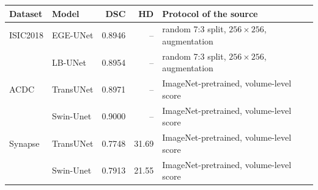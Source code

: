 \begin{tabular}{@{}llrrl@{}}
\toprule
Dataset & Model & DSC & HD\tnote{a} & Protocol of the source \\
\midrule
ISIC2018 & EGE-UNet \citep{Ruan2023EGEUNet} & 0.8946 & -- & random 7:3 split, $256\times256$, augmentation \\
 & LB-UNet \citep{Xu2024LBUNet} & 0.8954 & -- & random 7:3 split, $256\times256$, augmentation \\
ACDC & TransUNet \citep{Chen2021TransUNetArxiv} & 0.8971 & -- & ImageNet-pretrained, volume-level score \\
 & Swin-Unet \citep{Cao2022SwinUnet} & 0.9000 & -- & ImageNet-pretrained, volume-level score \\
Synapse & TransUNet \citep{Chen2021TransUNetArxiv} & 0.7748 & 31.69 & ImageNet-pretrained, volume-level score \\
 & Swin-Unet \citep{Cao2022SwinUnet} & 0.7913 & 21.55 & ImageNet-pretrained, volume-level score \\
\bottomrule
\end{tabular}
